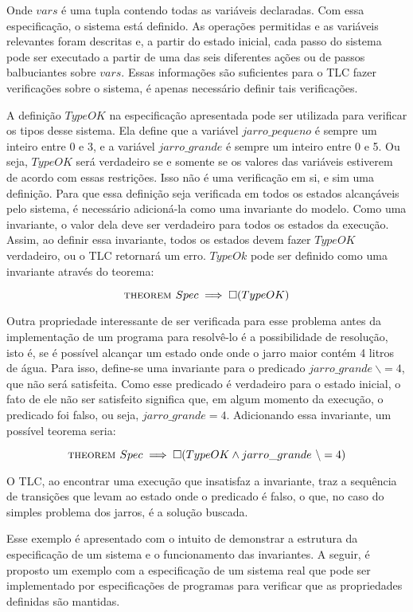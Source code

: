Onde $vars$ é uma tupla contendo todas as variáveis declaradas. Com essa especificação, o sistema está definido. As operações permitidas e as variáveis relevantes foram descritas e, a partir do estado inicial, cada passo do sistema pode ser executado a partir de uma das seis diferentes ações ou de passos balbuciantes sobre $vars$. Essas informações são suficientes para o TLC fazer verificações sobre o sistema, é apenas necessário definir tais verificações.

A definição $TypeOK$ na especificação apresentada pode ser utilizada para verificar os tipos desse sistema. Ela define que a variável $jarro\_pequeno$ é sempre um inteiro entre 0 e 3, e a variável $jarro\_grande$ é sempre um inteiro entre 0 e 5. Ou seja, $TypeOK$ será verdadeiro se e somente se os valores das variáveis estiverem de acordo com essas restrições. Isso não é uma verificação em si, e sim uma definição. Para que essa definição seja verificada em todos os estados alcançáveis pelo sistema, é necessário adicioná-la como uma invariante do modelo. Como uma invariante, o valor dela deve ser verdadeiro para todos os estados da execução. Assim, ao definir essa invariante, todos os estados devem fazer $TypeOK$ verdadeiro, ou o TLC retornará um erro. $TypeOk$ pode ser definido como uma invariante através do teorema:

\[\textsc{theorem } Spec \implies \square (TypeOK)\]

Outra propriedade interessante de ser verificada para esse problema antes da implementação de um programa para resolvê-lo é a possibilidade de resolução, isto é, se é possível alcançar um estado onde onde o jarro maior contém 4 litros de água. Para isso, define-se uma invariante para o predicado $jarro\_grande\ \backslash= 4$, que não será satisfeita. Como esse predicado é verdadeiro para o estado inicial, o fato de ele não ser satisfeito significa que, em algum momento da execução, o predicado foi falso, ou seja, $jarro\_grande = 4$. Adicionando essa invariante, um possível teorema seria:

\[\textsc{theorem } Spec \implies \square (TypeOK \land jarro\_grande\ \backslash= 4)\]

O TLC, ao encontrar uma execução que insatisfaz a invariante, traz a sequência de transições que levam ao estado onde o predicado é falso, o que, no caso do simples problema dos jarros, é a solução buscada.

Esse exemplo é apresentado com o intuito de demonstrar a estrutura da especificação de um sistema e o funcionamento das invariantes. A seguir, é proposto um exemplo com a especificação de um sistema real que pode ser implementado por especificações de programas para verificar que as propriedades definidas são mantidas. %

